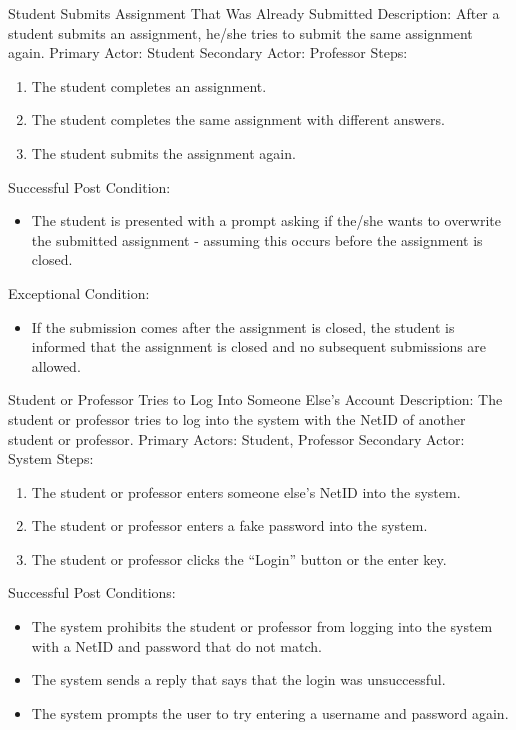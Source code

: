     \begin{subsection}{Student Submits Assignment That Was Already Submitted}
    Description: After a student submits an assignment, he/she tries to submit the same assignment again. \newline
    Primary Actor: Student \newline
    Secondary Actor: Professor \newline
    Steps:
    \begin{enumerate}
        \item{The student completes an assignment.}
        \item{The student completes the same assignment with different answers.}
        \item{The student submits the assignment again.}
    \end{enumerate}
    Successful Post Condition:
    \begin{itemize}
        \item{The student is presented with a prompt asking if the/she wants to overwrite the submitted assignment - assuming this occurs before the assignment is closed.} 
    \end{itemize}
    Exceptional Condition:
    \begin{itemize}
        \item{If the submission comes after the assignment is closed, the student is informed that the assignment is closed and no subsequent submissions are allowed.} 
    \end{itemize}
    \end{subsection}

    \begin{subsection}{Student or Professor Tries to Log Into Someone Else’s Account}
    Description: The student or professor tries to log into the  system with the NetID of another student or professor. \newline
    Primary Actors: Student, Professor \newline
    Secondary Actor: System \newline
    Steps:
    \begin{enumerate}
        \item{The student or professor enters someone else’s NetID into the system.}
        \item{The student or professor enters a fake password into the system.}
        \item{The student or professor clicks the “Login” button or the enter key.}
    \end{enumerate}
    Successful Post Conditions:
    \begin{itemize}
        \item{The system prohibits the student or professor from logging into the system with a NetID and password that do not match.}
        \item{The system sends a reply that says that the login was unsuccessful.}
        \item{The system prompts the user to try entering a username and password again.}
    \end{itemize}
    \end{subsection}








